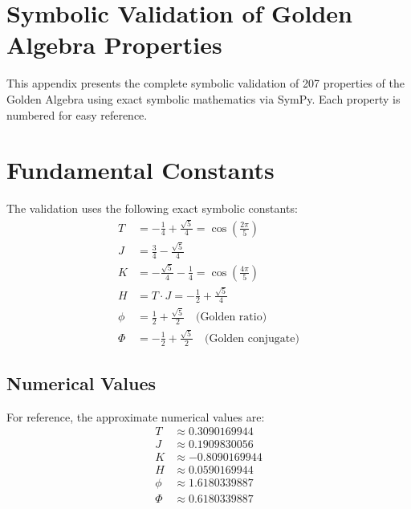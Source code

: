 



\appendix
\section{Symbolic Validation of Golden Algebra Properties}
\label{app:validation}

This appendix presents the complete symbolic validation of 207 properties of the Golden Algebra using exact symbolic mathematics via SymPy. Each property is numbered for easy reference.

\section{Fundamental Constants}
The validation uses the following exact symbolic constants:
\begin{align*}
T &= - \frac{1}{4} + \frac{\sqrt{5}}{4} = \cos\left(\frac{2\pi}{5}\right) \\
J &= \frac{3}{4} - \frac{\sqrt{5}}{4} \\
K &= - \frac{\sqrt{5}}{4} - \frac{1}{4} = \cos\left(\frac{4\pi}{5}\right) \\
H &= T \cdot J = - \frac{1}{2} + \frac{\sqrt{5}}{4} \\
\phi &= \frac{1}{2} + \frac{\sqrt{5}}{2} \quad \text{(Golden ratio)} \\
\Phi &= - \frac{1}{2} + \frac{\sqrt{5}}{2} \quad \text{(Golden conjugate)}
\end{align*}

\subsection{Numerical Values}
For reference, the approximate numerical values are:
\begin{align*}
T &\approx 0.3090169944 \\
J &\approx 0.1909830056 \\
K &\approx -0.8090169944 \\
H &\approx 0.0590169944 \\
\phi &\approx 1.6180339887 \\
\Phi &\approx 0.6180339887
\end{align*}

